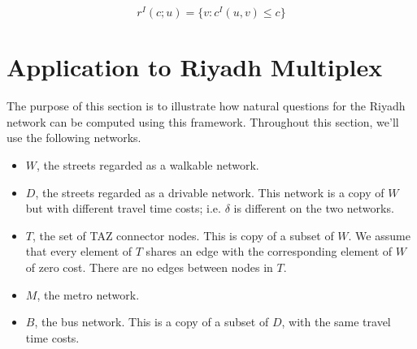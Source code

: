 \documentclass[english]{scrartcl}
\begin{document}
		\begin{equation*}
			r^{I}(c;u) = \{ v : c^{I}(u,v) \leq c \}
		\end{equation*}

\section{Application to Riyadh Multiplex}
	The purpose of this section is to illustrate how natural questions for the Riyadh network can be computed using this framework. Throughout this section, we'll use the following networks.
	\begin{itemize}
		\item $W$, the streets regarded as a walkable network. 
		\item $D$, the streets regarded as a drivable network. This network is a copy of $W$ but with different travel time costs; i.e. $\delta$ is different on the two networks. 
		\item $T$, the set of TAZ connector nodes. This is copy of a subset of $W$. We assume that every element of $T$ shares an edge with the corresponding element of $W$ of zero cost. There are no edges between nodes in $T$.  
		\item $M$, the metro network.
		\item $B$, the bus network. This is a copy of a subset of $D$, with the same travel time costs. 
	\end{itemize}
\end{document}
